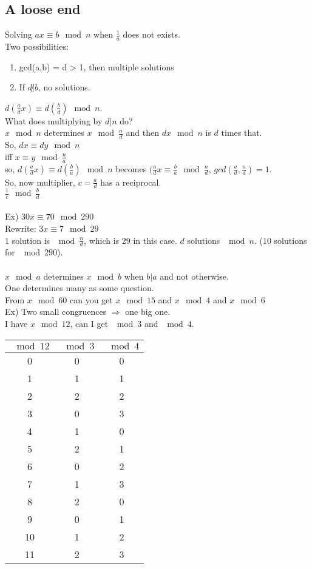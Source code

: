 \documentclass[13pt]{article}
\begin{document}
	\subsection*{A loose end}
		Solving $ax \equiv b \mod n$ when $\frac{1}{a}$ does not exists.\\
		Two possibilities:\\
		\begin{enumerate}
			\item gcd(a,b) = d > 1, then multiple solutions
			\item If $d \not| b$, no solutions.
		\end{enumerate}
		$d(\frac{a}{d}x) \equiv d(\frac{b}{d}) \mod n$.\\
		What does multiplying by $d|n$ do?\\
		$x \mod n$ determines $x \mod \frac{n}{d}$ and then $dx \mod n$ is
		$d$ times that.\\
		So, $dx \equiv dy \mod n$\\
		iff $x \equiv y \mod \frac{n}{a}$\\
		so, $d(\frac{a}{d}x) \equiv d(\frac{b}{a}) \mod n$ becomes
		$(\frac{a}{d}x \equiv \frac{b}{a} \mod \frac{n}{d}$, $gcd(\frac{a}{d},
		\frac{n}{d}) = 1$.\\
		So, now multiplier, $c = \frac{a}{d}$ has a reciprocal. \\
		$\frac{1}{c} \mod \frac{b}{d}$\\\\
		Ex) $30x \equiv 70 \mod 290$\\
		Rewrite: $3x \equiv 7 \mod 29$\\
		1 solution is $\mod \frac{n}{d}$, which is 29 in this case.
		$d$ solutions $\mod n$. (10 solutions for $\mod 290$).\\\\
		$x \mod a$ determines $x \mod b$ when $b|a$ and not otherwise.\\
		One determines many as some question.\\
		From $x \mod 60$ can you get $x \mod 15$ and $x \mod 4$ and $x \mod 6$\\
		Ex) Two small congruences $\Rightarrow$ one big one.\\
		I have $x \mod 12$, can I get $\mod 3$ and $\mod 4$.\\
		\begin{tabular}{c || c | c}
		$\mod 12$ & $\mod 3$ & $\mod 4$\\
		\hline
		0 & 0 & 0 \\
		1 & 1 & 1 \\
		2 & 2 & 2 \\
		3 & 0 & 3 \\
		4 & 1 & 0 \\
		5 & 2 & 1 \\
		6 & 0 & 2 \\
		7 & 1 & 3 \\
		8 & 2 & 0 \\
		9 & 0 & 1 \\
		10 & 1 & 2 \\
		11 & 2 & 3 \\
		\end{tabular}
\end{document}
